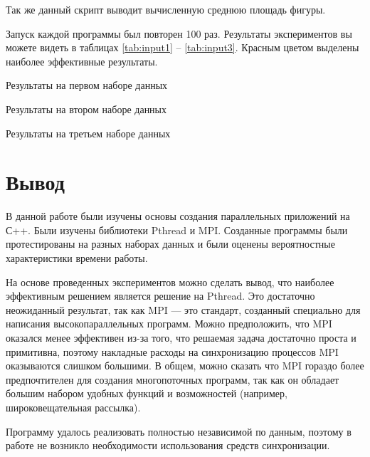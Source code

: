 Так же данный скрипт выводит вычисленную среднюю площадь фигуры.

Запуск каждой программы был повторен 100 раз. Результаты экспериментов вы можете видеть в таблицах \ref{tab:input1} -- \ref{tab:input3}. Красным цветом выделены наиболее эффективные результаты.

\begin{table}
\caption{Результаты на первом наборе данных}
\label{tab:input1}
\end{table}

\begin{table}
\caption{Результаты на втором наборе данных}
\label{tab:input2}
\end{table}

\begin{table}
\caption{Результаты на третьем наборе данных}
\label{tab:input3}
\end{table}

\section{Вывод}
В данной работе были изучены основы создания параллельных приложений на С++. Были изучены библиотеки Pthread и MPI. Созданные программы были протестированы на разных наборах данных и были оценены вероятностные характеристики времени работы.

На основе проведенных экспериментов можно сделать вывод, что наиболее эффективным решением является  решение на Pthread. Это достаточно неожиданный результат, так как MPI --- это стандарт, созданный специально для написания высокопараллельных программ. Можно предположить, что MPI оказался менее эффективен из-за того, что решаемая задача достаточно проста и примитивна, поэтому накладные расходы на синхронизацию процессов MPI оказываются слишком большими. В общем, можно сказать что MPI гораздо более предпочтителен для создания многопоточных программ, так как он обладает большим набором удобных функций и возможностей (например, широковещательная рассылка).

Программу удалось реализовать полностью независимой по данным, поэтому в работе не возникло необходимости использования средств синхронизации.

